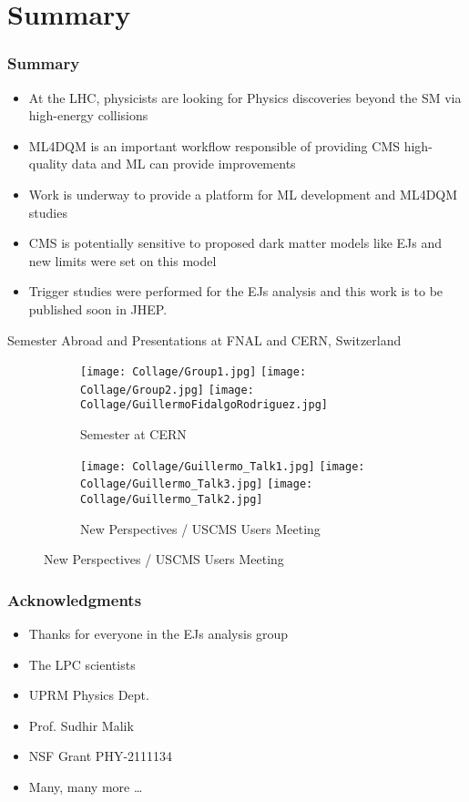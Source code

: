\documentclass[aspectratio=1610]{beamer}
\begin{document}
\section{Summary}

\begin{frame}
	\frametitle{Summary}
	\begin{itemize}
		\item At the LHC, physicists are looking for Physics discoveries beyond the SM via high-energy collisions
		\item ML4DQM is an important workflow responsible of providing CMS high-quality data and ML can provide improvements
		\item Work is underway to provide a platform for ML development and ML4DQM studies
		\item CMS is potentially sensitive to proposed dark matter models like EJs and new limits were set on this model
		\item Trigger studies were performed for the EJs analysis and this work is to be published soon in JHEP.
	\end{itemize}

\end{frame}

\begin{frame}{Semester Abroad and Presentations at FNAL and CERN, Switzerland}
	\begin{figure}
		\centering
		\begin{subfigure}[t]{.9\linewidth}
			\centering
			\caption*{Semester at CERN}
			\texttt{[image: Collage/Group1.jpg]}
			\texttt{[image: Collage/Group2.jpg]}
			\texttt{[image: Collage/GuillermoFidalgoRodriguez.jpg]}
		\end{subfigure}

		\begin{subfigure}[b]{.9\linewidth}
			\centering
			\texttt{[image: Collage/Guillermo\_Talk1.jpg]}
			\texttt{[image: Collage/Guillermo\_Talk3.jpg]}
			\texttt{[image: Collage/Guillermo\_Talk2.jpg]}
			\caption*{New Perspectives / USCMS Users Meeting}
		\end{subfigure}
	\end{figure}
\end{frame}



\begin{frame}
	\frametitle{Acknowledgments}

	\begin{itemize}
		\item Thanks for everyone in the EJs analysis group
		\item The LPC scientists
		\item UPRM Physics Dept.
		\item Prof. Sudhir Malik
		\item NSF Grant PHY-2111134
		\item Many, many more \dots
	\end{itemize}



\end{frame}
\end{document}
